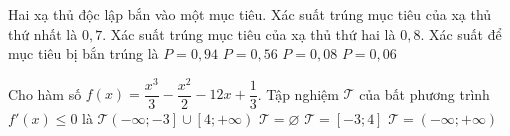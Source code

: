 \begin{ex}%
	Hai xạ thủ độc lập bắn vào một mục tiêu. Xác suất trúng mục tiêu của xạ thủ thứ nhất là $0,7$. Xác suất trúng mục tiêu của xạ thủ thứ hai là $0,8$. Xác suất để mục tiêu bị bắn trúng là
	\choice
	{\True $P=0{,}94$}
	 {$P=0{,}56$}
	{$P=0{,}08$}
	{ $P=0{,}06$}
\end{ex}
\begin{ex}%
	Cho hàm số $f(x) = \dfrac{x^3}{3} - \dfrac{x^2}{2} - 12x + \dfrac{1}{3}$. Tập nghiệm $\mathscr{T}$ của bất phương trình $f'(x) \leq 0$ là
	\choice
	{$\mathscr{T} \left(- \infty; - 3 \right] \cup \left[4; + \infty \right)$}
	{$\mathscr{T} = \varnothing$}
	{\True $\mathscr{T} =\left[-3;4 \right]$}
	{$\mathscr{T} = \left(- \infty; + \infty \right)$}
\end{ex}

